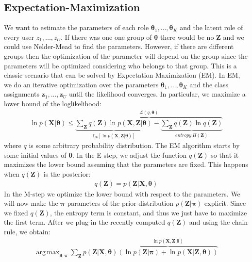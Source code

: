 \documentclass[smallextended]{svjour3}          %
\DeclareMathOperator*{\argmax}{arg\,max}
\begin{document}
\subsection{Expectation-Maximization} 
We want to estimate the parameters of each role $\boldsymbol{\theta}_1,...,\boldsymbol{\theta}_K$ and the latent role of every user $z_1,...,z_U$. If there was one one group of $\boldsymbol{\theta}$ there would be no $\mathbf{Z}$ and we could use Nelder-Mead to find the parameters. However, if there are different groups then the optimization of the parameter will depend on the group since the parameters will be optimized considering who belongs to that group. This is a classic scenario that can be solved by Expectation Maximization (EM). In EM, we do an iterative optimization over the parameters $\boldsymbol{\theta}_1,...,\boldsymbol{\theta}_K$ and the class assignments $\boldsymbol{z}_1,...,\boldsymbol{z}_U$ until the likelihood converges. In particular, we maximize a lower bound of the loglikelihood:
\begin{align}
\ln p(\mathbf{X} | \boldsymbol{\theta}) 
\leq
\overbrace{
\underbrace{
\sum_{\mathbf{Z}} q(\mathbf{Z})\ln p(\mathbf{X, \mathbf{Z} | \boldsymbol{\theta}})
}_{\mathbb{E}_\mathbf{Z}\left[\ln p(\mathbf{X, \mathbf{Z} | \boldsymbol{\theta}})\right]} 
-
\underbrace{
\sum_{\mathbf{Z}}
q(\mathbf{Z}) 
\ln q(\mathbf{Z})
}_{entropy~H(\mathbf{Z})}
}^{\mathcal{L}(q, \boldsymbol{\theta})}
\end{align}
where $q$ is some arbitrary probability distribution. The EM algorithm starts by some initial values of $\boldsymbol{\theta}$. In the E-step, we adjust the function $q(\mathbf{Z})$ so that it maximizes the lower bound assuming that the parameters are fixed. This happens when $q(\mathbf{Z})$ is the posterior:
\begin{align}
q(\mathbf{Z}) = p(\mathbf{Z} | \mathbf{X}, \boldsymbol{\theta}) 
\end{align}
In the M-step we optimize the lower bound with respect to the parameters. We will now make the $\boldsymbol{\pi}$ parameters of the prior distribution $p(\mathbf{Z} | \boldsymbol{\pi})$ explicit. Since we fixed $q(\mathbf{Z})$, the entropy term is constant, and thus we just have to maximize the first term. After we plug-in the recently computed $q(\mathbf{Z})$ and using the chain rule, we obtain:
\begin{align*}
\argmax_{\boldsymbol{\theta}, \boldsymbol{\pi}} \sum_{\mathbf{Z}} p(\mathbf{Z} | \mathbf{X}, \boldsymbol{\theta})
\overbrace{
\left(\ln p(\mathbf{Z} | \boldsymbol{\pi})  + \ln p(\mathbf{X  | \mathbf{Z}, \boldsymbol{\theta}})\right)
}^{\ln p(\mathbf{X}, \mathbf{Z} | \boldsymbol{\theta})}
\end{align*}
\end{document}
